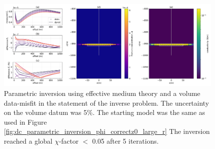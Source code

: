 \begin{figure}
    \begin{center}
    \includegraphics[width=\textwidth]{figures/inversion/dc_parametric_inversion_phi_vol_correctz0_large_r.png}
    \end{center}
\caption{
    Parametric inversion using effective medium theory and a volume data-misfit in the statement of the inverse problem.
    The uncertainty on the volume datum was 5\%. The starting model was the same as used in Figure \ref{fig:dc_parametric_inversion_phi_correctz0_large_r}
    The inversion reached a global $\chi$-factor $<$ 0.05 after 5 iterations.
}
\label{fig:dc_parametric_inversion_phi_vol_correctz0_large_r}
\end{figure}
